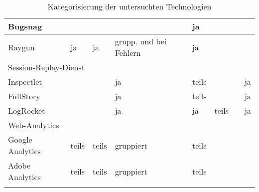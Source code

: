 \begin{longtable}{|p{4.10cm}|p{0.90cm}|p{0.90cm}|p{1.9cm}|p{1.75cm}|p{1.5cm}|p{1.4cm}|p{1.3cm}|}
Bugsnag &  &  &  & ja &  &  &  \\
\hline
Raygun & ja & ja & grupp. und bei \mbox{Fehlern} & ja &  &  &  \\
\hline
\hline
\multicolumn{8}{|l|}{Session-Replay-Dienst} \\
\hline
Inspectlet &  &  & ja & teils &  &  & ja \\
\hline
FullStory &  &  & ja & teils &  &  & ja \\
\hline
LogRocket &  &  & ja & ja & teils &  & ja \\
\hline
\hline
\multicolumn{8}{|l|}{Web-Analytics} \\
\hline
Google Analytics & teils & teils & gruppiert & teils &  &  &  \\
\hline
Adobe Analytics & teils & teils & gruppiert & teils &  &  &  \\
\hline
\caption{Kategorisierung der untersuchten Technologien}
\label{tab:technologie-kategorisierung}
\end{longtable}
\endgroup
